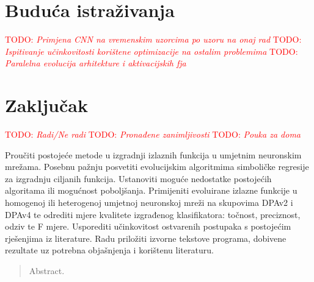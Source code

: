 \documentclass[times, utf8, diplomski]{fer}
\def\TODO#1{\noindent\textcolor{red}{TODO: \textit{#1}}\newline}
\def\todo#1{\TODO{#1}}
\begin{document}
\chapter{Buduća istraživanja}
\todo{Primjena CNN na vremenskim uzorcima po uzoru na onaj rad}
\todo{Ispitivanje učinkovitosti korištene optimizacije na ostalim problemima}
\todo{Paralelna evolucija arhitekture i aktivacijskih fja}

\chapter{Zaključak}
\todo{Radi/Ne radi}
\todo{Pronađene zanimljivosti}
\todo{Pouka za doma}




\begin{sazetak}
Proučiti postojeće metode u izgradnji izlaznih funkcija u umjetnim neuronskim mrežama. Posebnu pažnju posvetiti evolucijskim algoritmima simboličke regresije za izgradnju ciljanih funkcija. Ustanoviti moguće nedostatke postojećih algoritama ili mogućnost poboljšanja. Primijeniti evoluirane izlazne funkcije u homogenoj ili heterogenoj umjetnoj neuronskoj mreži na skupovima DPAv2 i DPAv4 te odrediti mjere kvalitete izgrađenog klasifikatora: točnost, preciznost, odziv te F mjere. Usporediti učinkovitost ostvarenih postupaka s postojećim rješenjima iz literature. Radu priložiti izvorne tekstove programa, dobivene rezultate uz potrebna objašnjenja i korištenu literaturu.

\end{sazetak}

\begin{abstract}
Abstract.

\end{abstract}
\end{document}

